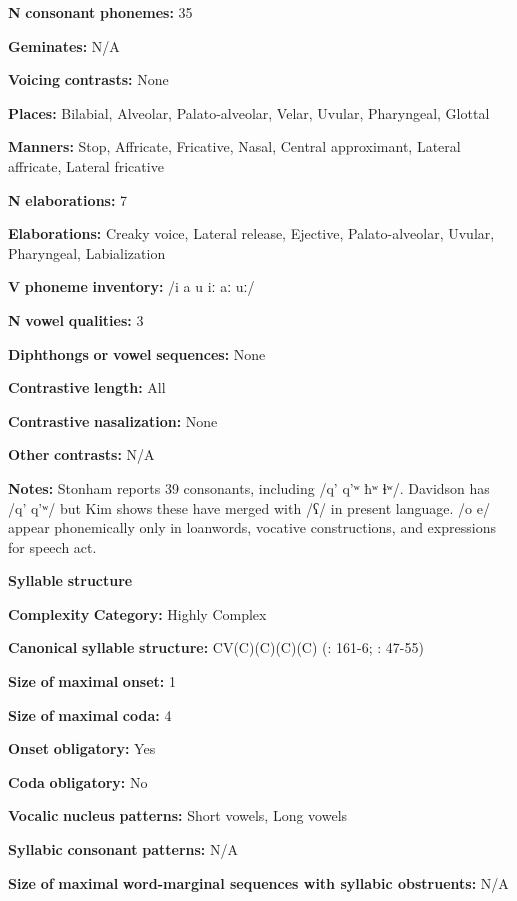 \begin{styleBody}
\textbf{N} \textbf{consonant} \textbf{phonemes:} 35

\textbf{Geminates:} N/A

\textbf{Voicing} \textbf{contrasts:} None

\textbf{Places:} Bilabial, Alveolar, Palato-alveolar, Velar, Uvular, Pharyngeal, Glottal

\textbf{Manners:} Stop, Affricate, Fricative, Nasal, Central approximant, Lateral affricate, Lateral fricative

\textbf{N} \textbf{elaborations:} 7

\textbf{Elaborations:} Creaky voice, Lateral release, Ejective, Palato-alveolar, Uvular, Pharyngeal, Labialization

\textbf{V} \textbf{phoneme} \textbf{inventory:} /i a u iː aː uː/

\textbf{N} \textbf{vowel} \textbf{qualities:} 3

\textbf{Diphthongs} \textbf{or} \textbf{vowel} \textbf{sequences:} None

\textbf{Contrastive} \textbf{length:} All

\textbf{Contrastive} \textbf{nasalization:} None

\textbf{Other} \textbf{contrasts:} N/A

\textbf{Notes:} Stonham reports 39 consonants, including /q’ q’ʷ ħʷ ɬʷ/. Davidson has /q’ q’ʷ/ but Kim shows these have merged with /ʕ/ in present language. /o e/ appear phonemically only in loanwords, vocative constructions, and expressions for speech act.

\textbf{Syllable} \textbf{structure}

\textbf{Complexity} \textbf{Category:} Highly Complex

\textbf{Canonical} \textbf{syllable} \textbf{structure:} CV(C)(C)(C)(C) (\citealt{Kim2003}: 161-6; \citealt{Stonham1999}: 47-55)

\textbf{Size} \textbf{of} \textbf{maximal} \textbf{onset:} 1

\textbf{Size} \textbf{of} \textbf{maximal} \textbf{coda:} 4

\textbf{Onset} \textbf{obligatory:} Yes

\textbf{Coda} \textbf{obligatory:} No

\textbf{Vocalic} \textbf{nucleus} \textbf{patterns:} Short vowels, Long vowels

\textbf{Syllabic} \textbf{consonant} \textbf{patterns:} N/A

\textbf{Size} \textbf{of} \textbf{maximal} \textbf{word{}-marginal sequences with syllabic obstruents:} N/A


\end{styleBody}
